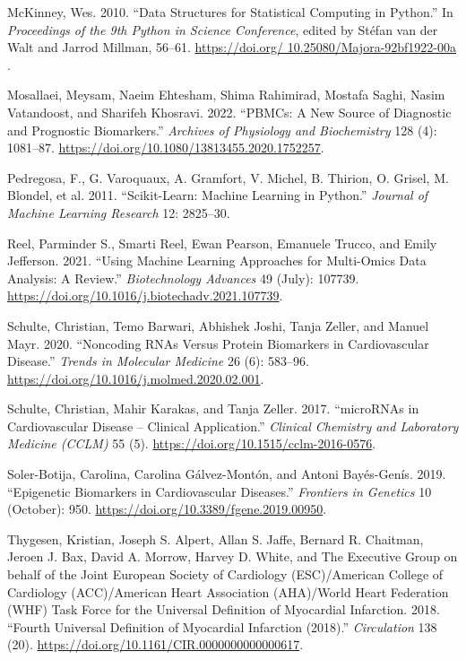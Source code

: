 \documentclass[smallextended]{svjour3}       %
\newlength{\cslhangindent}
\newlength{\cslentryspacingunit} %
\newenvironment{CSLReferences}[2] %
 {%
  \setlength{\parindent}{0pt}
  \ifodd #1
  \let\oldpar\par
  \def\par{\hangindent=\cslhangindent\oldpar}
  \fi
  \setlength{\parskip}{#2\cslentryspacingunit}
 }%
 {}
\begin{document}
\begin{CSLReferences}{1}{0}
\leavevmode{}%
McKinney, Wes. 2010. {``{D}ata {S}tructures for {S}tatistical
{C}omputing in {P}ython.''} In \emph{{P}roceedings of the 9th {P}ython
in {S}cience {C}onference}, edited by Stéfan van der Walt and Jarrod
Millman, 56--61.
\href{https://doi.org/\%2010.25080/Majora-92bf1922-00a\%20}{https://doi.org/
10.25080/Majora-92bf1922-00a }.

\leavevmode{}%
Mosallaei, Meysam, Naeim Ehtesham, Shima Rahimirad, Mostafa Saghi, Nasim
Vatandoost, and Sharifeh Khosravi. 2022. {``{PBMCs}: A New Source of
Diagnostic and Prognostic Biomarkers.''} \emph{Archives of Physiology
and Biochemistry} 128 (4): 1081--87.
\url{https://doi.org/10.1080/13813455.2020.1752257}.

\leavevmode{}%
Pedregosa, F., G. Varoquaux, A. Gramfort, V. Michel, B. Thirion, O.
Grisel, M. Blondel, et al. 2011. {``Scikit-Learn: Machine Learning in
{P}ython.''} \emph{Journal of Machine Learning Research} 12: 2825--30.

\leavevmode{}%
Reel, Parminder S., Smarti Reel, Ewan Pearson, Emanuele Trucco, and
Emily Jefferson. 2021. {``Using Machine Learning Approaches for
Multi-Omics Data Analysis: {A} Review.''} \emph{Biotechnology Advances}
49 (July): 107739.
\url{https://doi.org/10.1016/j.biotechadv.2021.107739}.

\leavevmode{}%
Schulte, Christian, Temo Barwari, Abhishek Joshi, Tanja Zeller, and
Manuel Mayr. 2020. {``Noncoding {RNAs} Versus {Protein} {Biomarkers} in
{Cardiovascular} {Disease}.''} \emph{Trends in Molecular Medicine} 26
(6): 583--96. \url{https://doi.org/10.1016/j.molmed.2020.02.001}.

\leavevmode{}%
Schulte, Christian, Mahir Karakas, and Tanja Zeller. 2017.
{``{microRNAs} in Cardiovascular Disease -- Clinical Application.''}
\emph{Clinical Chemistry and Laboratory Medicine (CCLM)} 55 (5).
\url{https://doi.org/10.1515/cclm-2016-0576}.

\leavevmode{}%
Soler-Botija, Carolina, Carolina Gálvez-Montón, and Antoni Bayés-Genís.
2019. {``Epigenetic {Biomarkers} in {Cardiovascular} {Diseases}.''}
\emph{Frontiers in Genetics} 10 (October): 950.
\url{https://doi.org/10.3389/fgene.2019.00950}.

\leavevmode{}%
Thygesen, Kristian, Joseph S. Alpert, Allan S. Jaffe, Bernard R.
Chaitman, Jeroen J. Bax, David A. Morrow, Harvey D. White, and The
Executive Group on behalf of the Joint European Society of Cardiology
(ESC)/American College of Cardiology (ACC)/American Heart Association
(AHA)/World Heart Federation (WHF) Task Force for the Universal
Definition of Myocardial Infarction. 2018. {``Fourth {Universal}
{Definition} of {Myocardial} {Infarction} (2018).''} \emph{Circulation}
138 (20). \url{https://doi.org/10.1161/CIR.0000000000000617}.


\end{CSLReferences}
\end{document}
